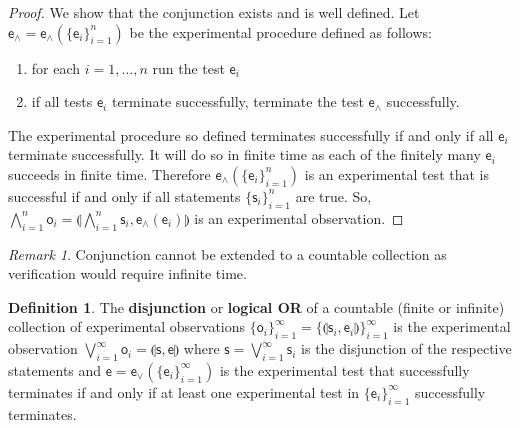 \documentclass[review]{elsarticle}
\theoremstyle{plain}%
\theoremstyle{definition}
\newtheorem{defn}{Definition}[section]
\theoremstyle{remark}
\newtheorem*{rem}{Remark}
\begin{document}
\begin{proof}
	We show that the conjunction exists and is well defined. Let $\mathsf{e}_\wedge=\mathsf{e}_\wedge(\{\mathsf{e}_i\}_{i=1}^{n})$ be the experimental procedure defined as follows:
	\begin{enumerate}
	\item for each $i=1,\ldots,n$ run the test $\mathsf{e}_i$
	\item if all tests $\mathsf{e}_i$ terminate successfully, terminate the test $\mathsf{e}_\wedge$ successfully.
	\end{enumerate}
	The experimental procedure so defined terminates successfully if and only if all $\mathsf{e}_i$ terminate successfully. It will do so in finite time as each of the finitely many $\mathsf{e}_i$ succeeds in finite time. Therefore $\mathsf{e}_\wedge(\{\mathsf{e}_i\}_{i=1}^{n})$ is an experimental test that is successful if and only if all statements $\{\mathsf{s}_i\}_{i=1}^{n}$ are true. So, $\bigwedge\limits_{i=1}^{n} \mathsf{o}_i = \llparenthesis\bigwedge\limits_{i=1}^{n} \mathsf{s}_i, \mathsf{e}_{\wedge}(\mathsf{e}_i)\rrparenthesis$ is an experimental observation.
\end{proof}

\begin{rem}
	Conjunction cannot be extended to a countable collection as verification would require infinite time.
\end{rem}

\begin{defn}
	The \textbf{disjunction} or \textbf{logical OR} of a countable (finite or infinite) collection of experimental observations $\{\mathsf{o}_i\}_{i=1}^{\infty}=\{\llparenthesis \mathsf{s}_i, \mathsf{e}_i\rrparenthesis\}_{i=1}^{\infty}$ is the experimental observation $\bigvee\limits_{i=1}^{\infty} \mathsf{o}_i = \llparenthesis \mathsf{s}, \mathsf{e}\rrparenthesis$ where $\mathsf{s} = \bigvee\limits_{i=1}^{\infty} \mathsf{s}_i$ is the disjunction of the respective statements and $\mathsf{e} = \mathsf{e}_\vee(\{\mathsf{e}_i\}_{i=1}^{\infty})$ is the experimental test that successfully terminates if and only if at least one experimental test in $\{\mathsf{e}_i\}_{i=1}^{\infty}$ successfully terminates.
\end{defn}
\end{document}
